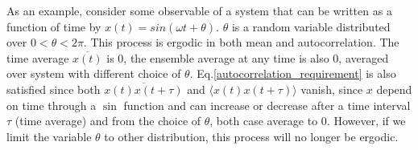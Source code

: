\documentclass{article}
\begin{document}
As an example, consider some observable of a system that can be written as a 
function of time by $x(t) = sin(\omega t + \theta)$. $\theta$ is a random variable 
distributed over $0 < \theta < 2\pi$. 
This process is ergodic in both mean and autocorrelation. The time average $\overline{x(t)}$
is 0, the ensemble average at any time is also 0, averaged over system with different 
choice of $\theta$. Eq.\ref{autocorrelation_requirement} is also satisfied since both 
$\overline{x(t)x(t+\tau)}$ and $\langle x(t)x(t+\tau) \rangle$ vanish, since $x$ depend
on time through a $\sin$ function and can increase or decrease after a time interval $\tau$
(time average) and from the choice of $\theta$,
both case average to 0. 
However, if we limit the variable $\theta$ to other distribution, this process will no longer 
be ergodic.
\end{document}
